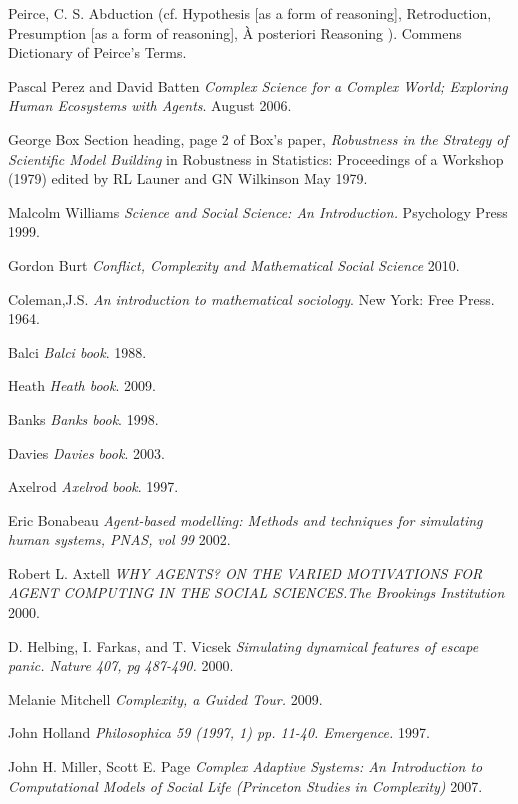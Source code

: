 \documentclass[11pt,oneside,a4paper,openright]{report}
\begin{document}
\begin{thebibliography}{49}
	Peirce, C. S. 
	Abduction (cf. Hypothesis [as a form of reasoning], Retroduction, Presumption [as a form of reasoning], À posteriori Reasoning ). Commens Dictionary of Peirce's Terms.
	
	Pascal Perez and David Batten
	\emph{Complex Science for a Complex World; Exploring Human Ecosystems with Agents}. 
	August 2006.

	George Box 
	Section heading, page 2 of Box's paper, 
	\emph{Robustness in the Strategy of Scientific Model Building} in Robustness in Statistics: Proceedings of a Workshop (1979) 
	edited by RL Launer and GN Wilkinson
	May 1979.

	Malcolm Williams
	\emph{Science and Social Science: An Introduction.} Psychology Press 
	1999. 

	Gordon Burt
	\emph{Conflict, Complexity and Mathematical Social Science}
	2010.

	Coleman,J.S.
	\emph{An introduction to mathematical sociology}. New York: Free Press.
	1964.

	Balci
	\emph{Balci book}.
	1988.

	Heath
	\emph{Heath book}.
	2009.

	Banks
	\emph{Banks book}.
	1998.

	Davies
	\emph{Davies book}.
	2003.

	Axelrod
	\emph{Axelrod book}.
	1997.


	Eric Bonabeau
	\emph{Agent-based modelling: Methods and techniques for simulating human systems, PNAS, vol 99} 
	2002.

	Robert L. Axtell
	\emph{WHY AGENTS? ON THE VARIED MOTIVATIONS FOR AGENT COMPUTING IN THE SOCIAL SCIENCES.The Brookings Institution}
	2000.

	D. Helbing, I. Farkas, and T. Vicsek 
	\emph{Simulating dynamical features of escape panic. Nature 407, pg 487-490.}
	2000.

	Melanie Mitchell
	\emph{Complexity, a Guided Tour.}
	2009.

	John Holland
	\emph{Philosophica 59 (1997, 1) pp. 11-40. Emergence.}
	1997.

	John H. Miller, Scott E. Page
	\emph{Complex Adaptive Systems: An Introduction to Computational Models of Social Life (Princeton Studies in Complexity)}
	2007.


\end{thebibliography}
\end{document}
